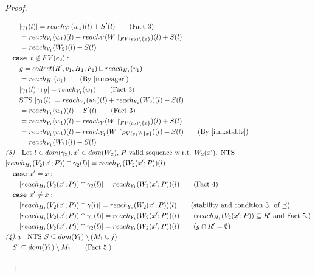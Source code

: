 \documentclass{easychair}
\theoremstyle{definition}
\begin{document}
\begin{proof}
\begin{description}
\begin{align*}
		&\quad\quad |\gamma_1(l)| = reach_{Y_1}(w_1)(l) + S'(l) \tag{Fact 3}\\
		&\quad\quad = reach_{Y_1}(w_1)(l) + 
			reach_{Y}(W\restriction_{FV(e_2) \setminus \{x\}})(l) + S(l) \\
		&\quad\quad = reach_{Y_1}(W_2)(l) + S(l)  \\
		&\quad \textbf{case } x \notin FV(e_2):\\
		&\quad\quad g = collect(R',v_1,H_1,F_1) \sqcup reach_{H_1}(v_1)\\
		&\quad\quad = reach_{H_1}(v_1) \tag{By \ref{itm:eager}}\\
		&\quad\quad |\gamma_1(l) \cap g| = reach_{Y_1}(w_1) \tag{Fact 3}\\
		&\quad\quad \text{STS } |\gamma_1(l)| = reach_{Y_1}(w_1)(l) + reach_{Y_1}(W_2)(l) + S(l)\\
		&\quad\quad = reach_{Y_1}(w_1)(l) + S'(l)  \tag{Fact 3}\\
		&\quad\quad = reach_{Y_1}(w_1)(l) + reach_{Y}(W\restriction_{FV(e_2)\setminus \{x\}})(l) + S(l)\\
		&\quad\quad = reach_{Y_1}(w_1)(l) + reach_{Y_1}(W\restriction_{FV(e_2)\setminus \{x\}})(l) + S(l) 		\tag{By \ref{itm:stable}}\\
		&\quad\quad = reach_{Y_1}(W_2)(l) + S(l)\\
		&\emph{(3)}\quad \text{Let $l \in dom(\gamma_2), x' \in dom(W_2)$, 
			$P$ valid sequence w.r.t. $W_2(x')$. NTS }\\ 
		&|reach_{H_1}(V_2(x';P)) \cap \gamma_2(l)| = reach_{Y_1}(W_2(x';P))(l)\\ 
		&\quad \textbf{case } x' = x:\\
		&\quad\quad |reach_{H_1}(V_2(x';P)) \cap \gamma_2(l)| = reach_{Y_1}(W_2(x';P))(l) \tag{Fact 4}\\ 
		&\quad \textbf{case } x' \ne x:\\
		&\quad\quad |reach_{H_1}(V_2(x';P)) \cap \gamma(l)| = reach_{Y_1}(W_2(x';P))(l) 
			\tag{stability and condition 3. of $\preceq$}\\ 
		&\quad\quad |reach_{H_1}(V_2(x';P)) \cap \gamma_1(l)| = reach_{Y_1}(W_2(x';P))(l) 
			\tag{$reach_{H_1}(V_2(x';P)) \subseteq R'$ and Fact 5.}\\
		&\quad\quad |reach_{H_1}(V_2(x';P)) \cap \gamma_2(l)| = reach_{Y_1}(W_2(x';P))(l) 
			\tag{$g \cap R' = \emptyset$}\\
		&\emph{(4).a}\quad \text{NTS } S \subseteq dom(Y_1) \setminus (M_1 \cup j)\\
		&\quad S' \subseteq dom(Y_1) \setminus M_1 \tag{Fact 5.}\\

\end{align*}
\end{description}
\end{proof}
\end{document}
